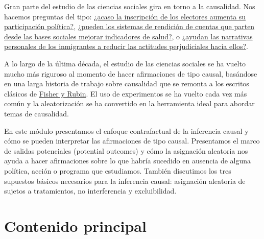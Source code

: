 \documentclass[12pt,spanish,]{book}
\begin{document}
Gran parte del estudio de las ciencias sociales gira en torno a la causalidad. Nos hacemos preguntas del tipo: \href{https://egap.org/resource/electoral-administration-in-kenya/}{¿acaso la inscripción de los electores aumenta su participación política?}, \href{https:\%20//\%20egap.org/resource/does-bottom-up-accountability-work-evidence-from-uganda/}{¿pueden los sistemas de rendición de cuentas que parten desde las bases sociales mejorar indicadores de salud?}, o \href{https://egap.org/resource/brief\%20-70-cómo-las-narrativas-personales-reducen-las-actitudes-negativas-hacia-los-inmigrantes-en-Kenia\%20/}{¿ayudan las narrativas personales de los inmigrantes a reducir las actitudes perjudiciales hacia ellos?}.

A lo largo de la última década, el estudio de las ciencias sociales se ha vuelto mucho más riguroso al momento de hacer afirmaciones de tipo causal, basándose en una larga historia de trabajo sobre causalidad que se remonta a los escritos clásicos de \protect\hyperlink{ux5cux2520causalinference-classics}{Fisher y Rubin}. El uso de experimentos se ha vuelto cada vez más común y la aleatorización se ha convertido en la herramienta ideal para abordar temas de causalidad.

En este módulo presentamos el enfoque contrafactual de la inferencia causal y cómo se pueden interpretar las afirmaciones de tipo causal. Presentamos el marco de salidas potenciales (potential outcomes) y cómo la asignación aleatoria nos ayuda a hacer afirmaciones sobre lo que habría sucedido en ausencia de alguna política, acción o programa que estudiamos. También discutimos los tres supuestos básicos necesarios para la inferencia causal: asignación aleatoria de sujetos a tratamientos, no interferencia y excluibilidad.

\hypertarget{contenido-principal-1}{%
\section{Contenido principal}\label{contenido-principal-1}}
\end{document}
